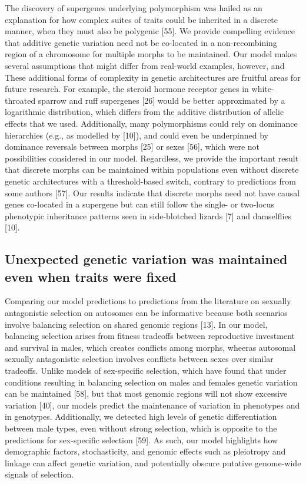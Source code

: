 \documentclass[
  11pt,
  a4paper,
]{article}
\begin{document}
The discovery of supergenes underlying polymorphism was hailed as an
explanation for how complex suites of traits could be inherited in a
discrete manner, when they must also be polygenic
{[}55{]}. We provide compelling
evidence that additive genetic variation need not be co-located in a
non-recombining region of a chromosome for multiple morphs to be
maintained. Our model makes several assumptions that might differ from
real-world examples, however, and These additional forms of complexity
in genetic architectures are fruitful areas for future research. For
example, the steroid hormone receptor genes in white-throated sparrow
and ruff supergenes {[}26{]} would be better
approximated by a logarithmic distribution, which differs from the
additive distribution of allelic effects that we used. Additionally,
many polymorphisms could rely on dominance hierarchies (e.g., as
modelled by {[}10{]}), and could even
be underpinned by dominance reversals between morphs
{[}25{]} or sexes
{[}56{]}, which were not
possibilities considered in our model. Regardless, we provide the
important result that discrete morphs can be maintained within
populations even without discrete genetic architectures with a
threshold-based switch, contrary to predictions from some authors
{[}57{]}. Our results indicate that
discrete morphs need not have causal genes co-located in a supergene but
can still follow the single- or two-locus phenotypic inheritance
patterns seen in side-blotched lizards {[}7{]}
and damselflies {[}10{]}.

\hypertarget{unexpected-genetic-variation-was-maintained-even-when-traits-were-fixed}{%
\subsection{Unexpected genetic variation was maintained even when traits were fixed}\label{unexpected-genetic-variation-was-maintained-even-when-traits-were-fixed}}

Comparing our model predictions to predictions from the literature on
sexually antagonistic selection on autosomes can be informative because
both scenarios involve balancing selection on shared genomic regions
{[}13{]}. In our model, balancing
selection arises from fitness tradeoffs between reproductive investment
and survival in males, which creates conflicts among morphs, wheeras
autosomal sexually antagonistic selection involves conflicts between
sexes over similar tradeoffs. Unlike models of sex-specific selection,
which have found that under conditions resulting in balancing selection
on males and females genetic variation can be maintained
{[}58{]}, but that most genomic regions
will not show excessive variation
{[}40{]}, our models predict the
maintenance of variation in phenotypes and in genotypes. Additionally,
we detected high levels of genetic differentiation between male types,
even without strong selection, which is opposite to the predictions for
sex-specific selection {[}59{]}. As such,
our model highlights how demographic factors, stochasticity, and genomic
effects such as pleiotropy and linkage can affect genetic variation, and
potentially obscure putative genome-wide signals of selection.
\end{document}

